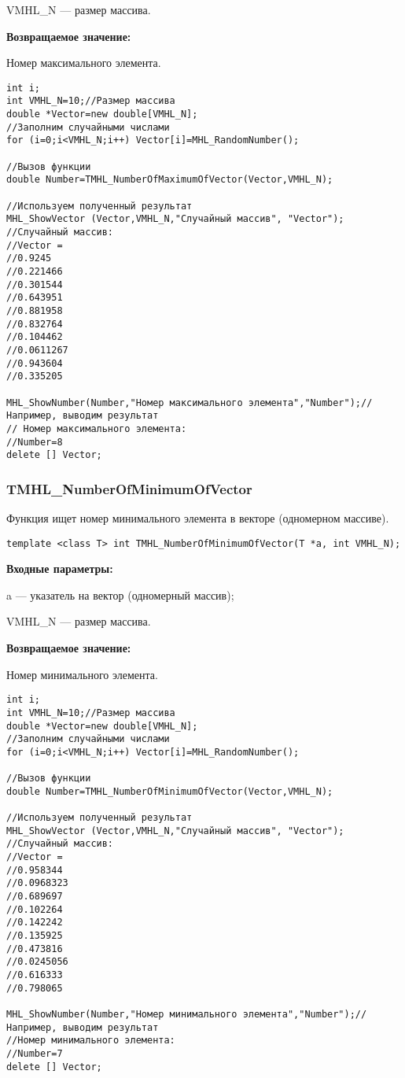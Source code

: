 \documentclass[a4paper,12pt]{article}
\begin{document}
 VMHL\_N --- размер массива.

\textbf{Возвращаемое значение:}

Номер максимального элемента.


\begin{lstlisting}[label=code_use_TMHL_NumberOfMaximumOfVector,caption=Пример использования]
int i;
int VMHL_N=10;//Размер массива
double *Vector=new double[VMHL_N];
//Заполним случайными числами
for (i=0;i<VMHL_N;i++) Vector[i]=MHL_RandomNumber();

//Вызов функции
double Number=TMHL_NumberOfMaximumOfVector(Vector,VMHL_N);

//Используем полученный результат
MHL_ShowVector (Vector,VMHL_N,"Случайный массив", "Vector");
//Случайный массив:
//Vector =
//0.9245
//0.221466
//0.301544
//0.643951
//0.881958
//0.832764
//0.104462
//0.0611267
//0.943604
//0.335205

MHL_ShowNumber(Number,"Номер максимального элемента","Number");//Например, выводим результат
// Номер максимального элемента:
//Number=8
delete [] Vector;
\end{lstlisting}

\subsubsection{TMHL\_NumberOfMinimumOfVector}\label{TMHL_NumberOfMinimumOfVector}

Функция ищет номер минимального элемента в векторе (одномерном массиве).


\begin{lstlisting}[label=code_syntax_TMHL_NumberOfMinimumOfVector,caption=Синтаксис]
template <class T> int TMHL_NumberOfMinimumOfVector(T *a, int VMHL_N);
\end{lstlisting}

\textbf{Входные параметры:}

 a --- указатель на вектор (одномерный массив);
 
 VMHL\_N --- размер массива.

\textbf{Возвращаемое значение:}

Номер минимального элемента.


\begin{lstlisting}[label=code_use_TMHL_NumberOfMinimumOfVector,caption=Пример использования]
int i;
int VMHL_N=10;//Размер массива
double *Vector=new double[VMHL_N];
//Заполним случайными числами
for (i=0;i<VMHL_N;i++) Vector[i]=MHL_RandomNumber();

//Вызов функции
double Number=TMHL_NumberOfMinimumOfVector(Vector,VMHL_N);

//Используем полученный результат
MHL_ShowVector (Vector,VMHL_N,"Случайный массив", "Vector");
//Случайный массив:
//Vector =
//0.958344
//0.0968323
//0.689697
//0.102264
//0.142242
//0.135925
//0.473816
//0.0245056
//0.616333
//0.798065

MHL_ShowNumber(Number,"Номер минимального элемента","Number");//Например, выводим результат
//Номер минимального элемента:
//Number=7
delete [] Vector;
\end{lstlisting}
\end{document}
